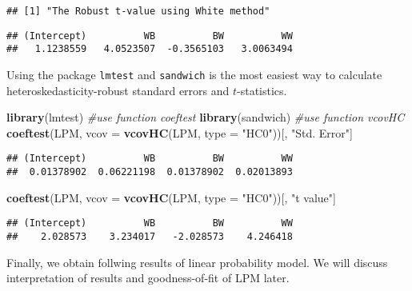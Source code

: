 \documentclass[
  12pt,
]{article}
\newenvironment{Shaded}{\begin{snugshade}}{\end{snugshade}}
\newcommand{\CommentTok}[1]{\textcolor[rgb]{0.56,0.35,0.01}{\textit{#1}}}
\newcommand{\DataTypeTok}[1]{\textcolor[rgb]{0.13,0.29,0.53}{#1}}
\newcommand{\KeywordTok}[1]{\textcolor[rgb]{0.13,0.29,0.53}{\textbf{#1}}}
\newcommand{\NormalTok}[1]{#1}
\newcommand{\StringTok}[1]{\textcolor[rgb]{0.31,0.60,0.02}{#1}}
\begin{document}
\begin{verbatim}
## [1] "The Robust t-value using White method"
\end{verbatim}

\begin{verbatim}
## (Intercept)          WB          BW          WW 
##   1.1238559   4.0523507  -0.3565103   3.0063494
\end{verbatim}

Using the package \texttt{lmtest} and \texttt{sandwich} is the most
easiest way to calculate heteroskedasticity-robust standard errors and
\(t\)-statistics.

\begin{Shaded}
\begin{Highlighting}[]
\KeywordTok{library}\NormalTok{(lmtest) }\CommentTok{\#use function \textasciigrave{}coeftest\textasciigrave{}}
\KeywordTok{library}\NormalTok{(sandwich) }\CommentTok{\#use function \textasciigrave{}vcovHC\textasciigrave{}}
\KeywordTok{coeftest}\NormalTok{(LPM, }\DataTypeTok{vcov =} \KeywordTok{vcovHC}\NormalTok{(LPM, }\DataTypeTok{type =} \StringTok{"HC0"}\NormalTok{))[, }\StringTok{"Std. Error"}\NormalTok{]}
\end{Highlighting}
\end{Shaded}

\begin{verbatim}
## (Intercept)          WB          BW          WW 
##  0.01378902  0.06221198  0.01378902  0.02013893
\end{verbatim}

\begin{Shaded}
\begin{Highlighting}[]
\KeywordTok{coeftest}\NormalTok{(LPM, }\DataTypeTok{vcov =} \KeywordTok{vcovHC}\NormalTok{(LPM, }\DataTypeTok{type =} \StringTok{"HC0"}\NormalTok{))[, }\StringTok{"t value"}\NormalTok{]}
\end{Highlighting}
\end{Shaded}

\begin{verbatim}
## (Intercept)          WB          BW          WW 
##    2.028573    3.234017   -2.028573    4.246418
\end{verbatim}

Finally, we obtain follwing results of linear probability model. We will
discuss interpretation of results and goodness-of-fit of LPM later.
\end{document}
